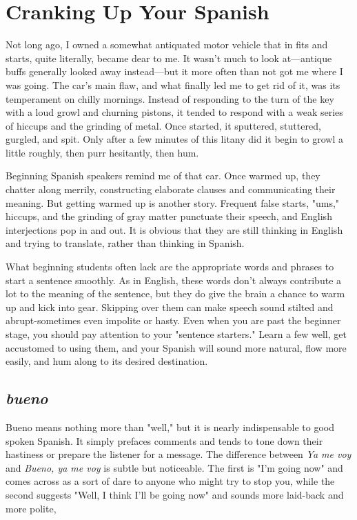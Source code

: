 \chapter{Cranking Up Your Spanish}

Not long ago, I owned a somewhat antiquated motor vehicle
that in fits and starts, quite literally, became dear to me. It wasn't
much to look at---antique buffs generally looked away instead---but
it more often than not got me where I was going. The car's main flaw,
and what finally led me to get rid of it, was its temperament on chilly
mornings. Instead of responding to the turn of the key with a loud
growl and churning pistons, it tended to respond with a weak series of
hiccups and the grinding of metal. Once started, it sputtered, stuttered,
gurgled, and spit. Only after a few minutes of this litany did it begin to
growl a little roughly, then purr hesitantly, then hum.

Beginning Spanish speakers remind me of that car. Once
warmed up, they chatter along merrily, constructing elaborate clauses
and communicating their meaning. But getting warmed up is another
story. Frequent false starts, "ums," hiccups, and the grinding of gray
matter punctuate their speech, and English interjections pop in and
out. It is obvious that they are still thinking in English and trying to
translate, rather than thinking in Spanish.

What beginning students often lack are the appropriate words
and phrases to start a sentence smoothly. As in English, these words
don't always contribute a lot to the meaning of the sentence, but they
do give the brain a chance to warm up and kick into gear. Skipping
over them can make speech sound stilted and abrupt-sometimes
even impolite or hasty. Even when you are past the beginner stage, you
should pay attention to your "sentence starters." Learn a few well, get
accustomed to using them, and your Spanish will sound more natural,
flow more easily, and hum along to its desired destination.

\section{\emph{bueno}}

Bueno means nothing more than "well," but it is nearly indispensable to good spoken Spanish. It simply prefaces comments and tends
to tone down their hastiness or prepare the listener for a message. The
difference between \emph{Ya me voy} and \emph{Bueno, ya me voy} is subtle but noticeable. The first is "I'm going now" and comes across as a sort of dare
to anyone who might try to stop you, while the second suggests "Well,
I think I'll be going now" and sounds more laid-back and more polite,

